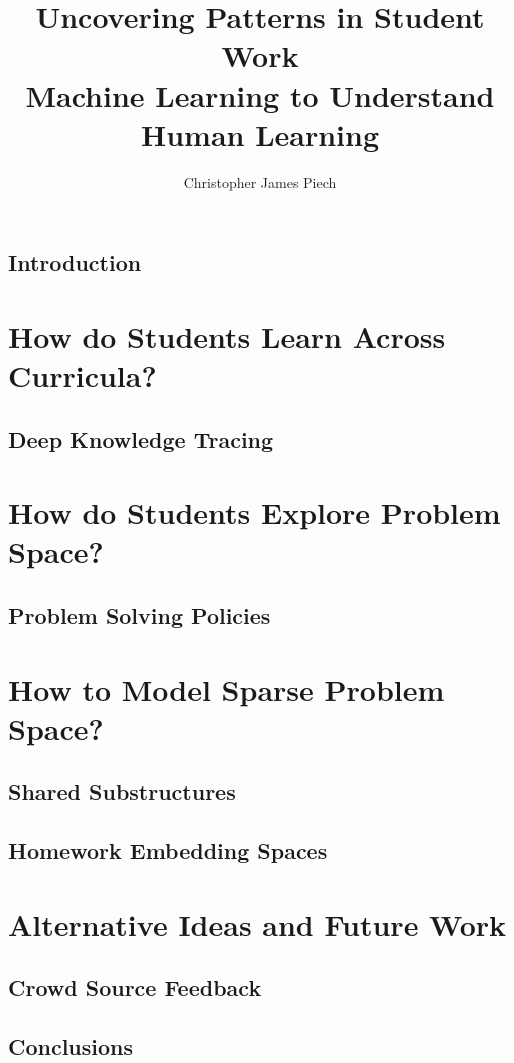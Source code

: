 \documentclass{report}
\begin{document}
\newcommand{\Chris}[1]{{\color{green}{\bf\sf [Chris: #1]}}}

\title{Uncovering Patterns in Student Work\\
            Machine Learning to Understand Human Learning}
\author{Christopher James Piech}
 
\beforepreface
{}



\afterpreface

\chapter{Introduction}


\part{How do Students Learn Across Curricula?}

\chapter{Deep Knowledge Tracing}


\part{How do Students Explore Problem Space?}

\chapter{Problem Solving Policies}


\part{How to Model Sparse Problem Space?}

\chapter{Shared Substructures}


\chapter{Homework Embedding Spaces}


\part{Alternative Ideas and Future Work}

\chapter{Crowd Source Feedback}


\chapter{Conclusions}



 
\end{document}
